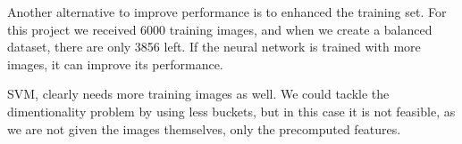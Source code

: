 \documentclass{article} %
\begin{document}
Another alternative to improve performance is to enhanced the training set. 
For this project we received 6000 training images, and when we create a balanced dataset, there are only 3856 left.
If the neural network is trained with more images, it can improve its performance.

SVM, clearly needs more training images as well. We could tackle the dimentionality problem by using less buckets, but in this case it is not feasible, as we are not given the images themselves, only the precomputed features.



\end{document}
